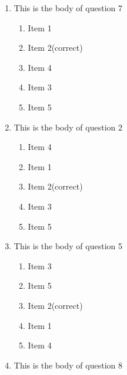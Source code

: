 \documentclass[amsfonts,bezier,leqno,fleqn,12pt,a4paper]{article}
\begin{document}
{{{{\begin{large}
\begin{enumerate}
\begin{enumerate}
\item  Item 4
\item  Item 3
\item  Item 1
\item  Item 2\hfill {\small (correct)}
\item  Item 5

\end{enumerate}
\newpage


\item This is the body of question 7
\vspace {0.3in}
\setcounter{equation}{0}

\begin{enumerate}
\item  Item 1
\item  Item 2\hfill {\small (correct)}
\item  Item 4
\item  Item 3
\item  Item 5

\end{enumerate}

\vspace {3.5cm}


\item This is the body of question 2
\vspace {0.3in}
\setcounter{equation}{0}

\begin{enumerate}
\item  Item 4
\item  Item 1
\item  Item 2\hfill {\small (correct)}
\item  Item 3
\item  Item 5

\end{enumerate}
\newpage


\item This is the body of question 5
\vspace {0.3in}
\setcounter{equation}{0}

\begin{enumerate}
\item  Item 3
\item  Item 5
\item  Item 2\hfill {\small (correct)}
\item  Item 1
\item  Item 4

\end{enumerate}

\vspace {3.5cm}


\item This is the body of question 8
\vspace {0.3in}
\setcounter{equation}{0}


\end{enumerate}
\end{large}}}}}
\end{document}
